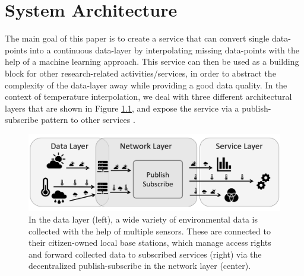 \chapter{System Architecture}

The main goal of this paper is to create a service that can convert single data-points into a continuous data-layer by interpolating missing data-points with the help of a machine learning approach. This service can then be used as a building block for other research-related activities/services, in order to abstract the complexity of the data-layer away while providing a good data quality.
In the context of temperature interpolation, we deal with three different architectural layers that are shown in Figure \ref{fig:system-architecture-overview}, and expose the service via a publish-subscribe pattern to other services \cite{bornholdt2019sane}.

\begin{figure}[h]
    \centering
    \includegraphics[width=\textwidth]{images/expose-system-architecture.png}
    \caption{In the data layer (left), a wide variety of environmental data is collected with the help of multiple sensors. These are connected to their citizen-owned local base stations, which manage access rights and forward collected data to subscribed services (right) via the decentralized publish-subscribe in the network layer (center).}
    \label{fig:system-architecture-overview}
\end{figure}

